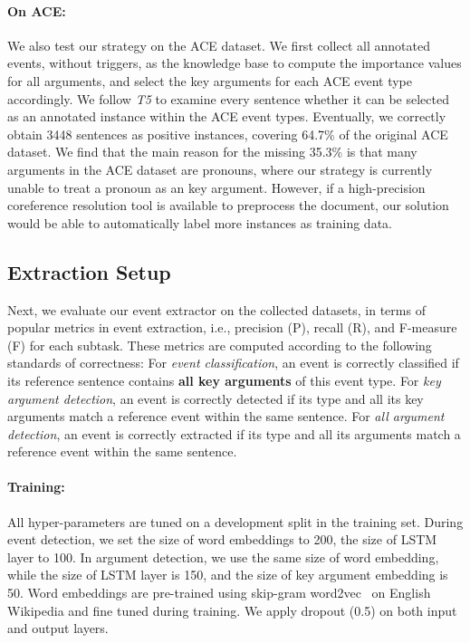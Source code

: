 \paragraph{On ACE:} We also test our strategy on the ACE dataset.
We first collect all annotated events, without triggers, as the knowledge base
to compute the importance values for all arguments, and select the key arguments
for each ACE event type accordingly.  We follow \textit{T5} to examine every sentence
whether it can be selected as an annotated instance within the ACE event types.
Eventually, we correctly obtain 3448 sentences as positive instances, covering
64.7\% of the original ACE dataset.  We find that the main reason for the
missing 35.3\% is that many arguments in the ACE dataset are pronouns,
where our strategy is currently unable to treat a pronoun as an key argument. However,
if a high-precision coreference resolution tool is available to preprocess the document,
our solution would be able to automatically label more instances as training data.

 \subsection{Extraction Setup}\label{sec:evalevent}
Next, we evaluate our event extractor on the collected datasets,
in terms of popular metrics in event extraction, i.e., precision (P), recall (R), and F-measure (F) for each subtask. These metrics are computed according to the following standards of correctness:
For \emph{event classification}, an event is correctly classified if its reference sentence contains \textbf{all key arguments} of this event type.
For \emph{key argument detection}, an event is correctly detected if its type and all its key arguments match a reference event within the same sentence.
For \emph{all argument detection}, an event is correctly extracted if its type and all its arguments match a reference event within the same sentence.

\paragraph{Training:} All hyper-parameters are tuned on a development split in the training set. During event detection, we set the size of word embeddings to 200, the size of LSTM layer to 100. In argument detection, we use the same size of word embedding, while the size of LSTM layer is 150, and the size of key argument embedding is 50. Word embeddings are pre-trained using skip-gram word2vec~\cite{mikolov2013distributed} on English Wikipedia and fine tuned during training. We apply dropout (0.5) on both input and output layers.




